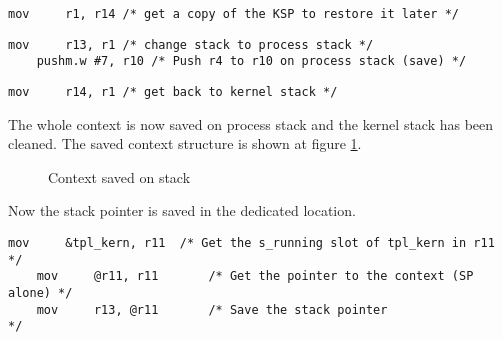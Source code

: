 \documentclass[11pt, oneside]{article}   	%
\begin{document}
\begin{lstlisting}[backgroundcolor=\color{red!15}]
    mov     r1, r14	/* get a copy of the KSP to restore it later */
\end{lstlisting}
\begin{lstlisting}[backgroundcolor=\color{yellow!15}]
    mov     r13, r1	/* change stack to process stack */	
    pushm.w #7, r10	/* Push r4 to r10 on process stack (save) */
\end{lstlisting}
\begin{lstlisting}[backgroundcolor=\color{red!15}]
    mov     r14, r1	/* get back to kernel stack */
\end{lstlisting}

The whole context is now saved on process stack and the kernel stack has been cleaned. The saved context structure is shown at figure \ref{fig:context}.


\begin{figure}[h!]
\caption{Context saved on stack}
\begin{center}
\end{center}
\label{fig:context}
\end{figure}

Now the stack pointer is saved in the dedicated location.

\begin{lstlisting}[backgroundcolor=\color{red!15}]
    mov     &tpl_kern, r11  /* Get the s_running slot of tpl_kern in r11 */
    mov     @r11, r11       /* Get the pointer to the context (SP alone) */
    mov     r13, @r11       /* Save the stack pointer                    */
\end{lstlisting}
\end{document}
